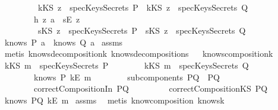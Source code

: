 \begin{isabellebody}
\ \ \ \ \ \ \ \ \ kKS\ z\ {\isasymnotin}\ specKeysSecrets\ P\ {\isasymand}\ kKS\ z\ {\isasymnotin}\ specKeysSecrets\ Q{\isachardoublequoteclose}\isanewline
\ \ \ \ \ \ \ \ h{}{\isacharcolon}{\isachardoublequoteopen}{\isasymforall}\ z{\isachardot}\ a\ {\isacharequal}\ sE\ z\ {\isasymlongrightarrow}\ \isanewline
\ \ \ \ \ \ \ \ \ sKS\ z\ {\isasymnotin}\ specKeysSecrets\ P\ {\isasymand}\ sKS\ z\ {\isasymnotin}\ specKeysSecrets\ Q{\isachardoublequoteclose}\isanewline
{}\ {\isachardoublequoteopen}knows\ P\ {\isacharbrackleft}a{\isacharbrackright}\ {\isasymor}\ knows\ Q\ {\isacharbrackleft}a{\isacharbrackright}{\isachardoublequoteclose}\isanewline
%
\isadelimproof
%
\endisadelimproof
%
\isatagproof
{}\isamarkupfalse%
\ assms\isanewline
{}\isamarkupfalse%
\ {\isacharparenleft}metis\ knows{\isacharunderscore}decomposition{\isacharunderscore}{}{\isacharunderscore}k\ knows{\isacharunderscore}decomposition{\isacharunderscore}{}{\isacharunderscore}s{\isacharparenright}%
\endisatagproof
{\isafoldproof}%
%
\isadelimproof
\ \isanewline
%
\endisadelimproof
\isanewline
{}\isamarkupfalse%
\ knows{\isacharunderscore}composition{}{\isacharunderscore}k{\isacharcolon}\isanewline
{}\ {\isachardoublequoteopen}{\isacharparenleft}kKS\ m{\isacharparenright}\ {\isasymnotin}\ specKeysSecrets\ P{\isachardoublequoteclose}\isanewline
\ \ \ \ \ \ \ \ {\isachardoublequoteopen}{\isacharparenleft}kKS\ m{\isacharparenright}\ {\isasymnotin}\ specKeysSecrets\ Q{\isachardoublequoteclose}\isanewline
\ \ \ \ \ \ \ \ {\isachardoublequoteopen}knows\ P\ {\isacharbrackleft}kE\ m{\isacharbrackright}{\isachardoublequoteclose}\isanewline
\ \ \ \ \ \ \ \ {\isachardoublequoteopen}subcomponents\ PQ\ {\isacharequal}\ {\isacharbraceleft}P{\isacharcomma}Q{\isacharbraceright}{\isachardoublequoteclose}\isanewline
\ \ \ \ \ \ \ \ {\isachardoublequoteopen}correctCompositionIn\ PQ{\isachardoublequoteclose}\ \isanewline
\ \ \ \ \ \ \ \ {\isachardoublequoteopen}correctCompositionKS\ PQ{\isachardoublequoteclose}\isanewline
{}\ {\isachardoublequoteopen}knows\ PQ\ {\isacharbrackleft}kE\ m{\isacharbrackright}{\isachardoublequoteclose}\isanewline
%
\isadelimproof
%
\endisadelimproof
%
\isatagproof
{}\isamarkupfalse%
\ assms\ \isamarkupfalse%
\ {\isacharparenleft}metis\ know{\isacharunderscore}composition\ knows{}k{\isacharparenright}%
\endisatagproof

\end{isabellebody}
